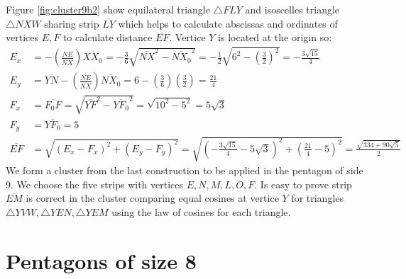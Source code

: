 \documentclass[11pt]{article}
\begin{document}
Figure \ref{fig:cluster9b2} show equilateral triangle $\triangle{FLY}$ and isoscelles triangle $\triangle{NXW}$ sharing strip $\overline{LY}$ which helps to calculate abscissas and ordinates of vertices $E,F$ to calculate distance $\overline{EF}$. Vertice $Y$ is located at the origin so:
\begin{align}
E_x &= - \left(\frac{\overline{NE}}{\overline{NX}}\right)\overline{XX_0}
 = -\frac{3}6\sqrt{\overline{NX}^2 - \overline{NX_0}^2}
 = -\frac{1}{2}\sqrt{6^2 - \left(\frac{3}2\right)^2} = -\frac{3\sqrt{15}}4 \\
E_y &= \overline{YN} - \left(\frac{\overline{NE}}{\overline{NX}}\right)\overline{NX_0}
 = 6 - \left(\frac{3}6\right)\left(\frac{3}2\right) = \frac{21}4\\
F_x &= \overline{F_0F} = \sqrt{\overline{YF}^2 - \overline{YF_0}^2}
 = \sqrt{10^2 - 5^2} = 5\sqrt3\\
F_y &= \overline{YF_0} = 5\\
\overline{EF} &= \sqrt{(E_x - F_x)^2 + (E_y - F_y)^2}
 = \sqrt{\left(-\frac{3\sqrt{15}}{4} -5\sqrt3 \right)^2 + \left(\frac{21}4 - 5\right)^2}
 = \frac{\sqrt{334+90\sqrt5}}2
\end{align}
We form a cluster from the last construction to be applied in the pentagon of side $9$. We choose the five strips with vertices $E,N,M,L,O,F$. Is easy to prove strip $\overline{EM}$ is correct in the cluster comparing equal cosines at vertice $Y$ for triangles $\triangle{YVW},\triangle{YEN},\triangle{YEM}$ using the law of cosines for each triangle.

\section{Pentagons of size 8}
\end{document}
